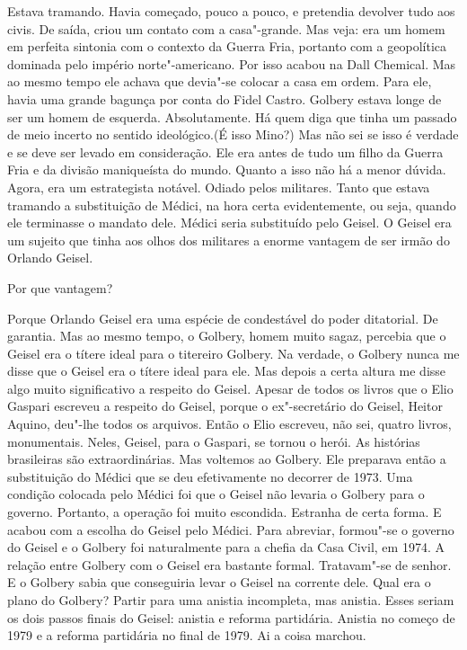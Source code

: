 \falaM Estava tramando. Havia começado, pouco a pouco, e pretendia devolver
tudo aos civis. De saída, criou um contato com a casa"-grande. Mas veja:
era um homem em perfeita sintonia com o contexto da Guerra Fria,
portanto com a geopolítica dominada pelo império norte"-americano. Por
isso acabou na Dall Chemical. Mas ao mesmo tempo ele achava que devia"-se
colocar a casa em ordem. Para ele, havia uma grande bagunça por conta do
Fidel Castro. Golbery estava longe de ser um homem de esquerda.
Absolutamente. Há quem diga que tinha um passado de meio incerto no
sentido ideológico.(É isso Mino?) Mas não sei se isso é verdade e se
deve ser levado em consideração. Ele era antes de tudo um filho da
Guerra Fria e da divisão maniqueísta do mundo. Quanto a isso não há a
menor dúvida. Agora, era um estrategista notável. Odiado pelos
militares. Tanto que estava tramando a substituição de Médici, na hora
certa evidentemente, ou seja, quando ele terminasse o mandato dele.
Médici seria substituído pelo Geisel. O Geisel era um sujeito que tinha
aos olhos dos militares a enorme vantagem de ser irmão do Orlando
Geisel.

\falaG Por que vantagem?

\falaM Porque Orlando Geisel era uma espécie de condestável do poder
ditatorial. De garantia. Mas ao mesmo tempo, o Golbery, homem muito
sagaz, percebia que o Geisel era o títere ideal para o titereiro
Golbery. Na verdade, o Golbery nunca me disse que o Geisel era o títere
ideal para ele. Mas depois a certa altura me disse algo muito
significativo a respeito do Geisel. Apesar de todos os livros que o Elio
Gaspari escreveu a respeito do Geisel, porque o ex"-secretário do Geisel,
Heitor Aquino, deu"-lhe todos os arquivos. Então o Elio escreveu, não
sei, quatro livros, monumentais. Neles, Geisel, para o Gaspari, se
tornou o herói. As histórias brasileiras são extraordinárias. Mas
voltemos ao Golbery. Ele preparava então a substituição do Médici que se
deu efetivamente no decorrer de 1973. Uma condição colocada pelo Médici
foi que o Geisel não levaria o Golbery para o governo. Portanto, a
operação foi muito escondida. Estranha de certa forma. E acabou com a
escolha do Geisel pelo Médici. Para abreviar, formou"-se o governo do
Geisel e o Golbery foi naturalmente para a chefia da Casa Civil, em
1974. A relação entre Golbery com o Geisel era bastante formal.
Tratavam"-se de senhor. E o Golbery sabia que conseguiria levar o Geisel
na corrente dele. Qual era o plano do Golbery? Partir para uma anistia
incompleta, mas anistia. Esses seriam os dois passos finais do Geisel:
anistia e reforma partidária. Anistia no começo de 1979 e a reforma
partidária no final de 1979. Ai a coisa marchou.

